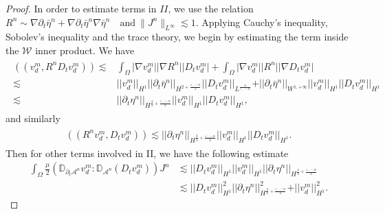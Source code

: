 \documentclass[letterpaper,reqno,10pt,twoside]{amsart}
\theoremstyle{definition}
\theoremstyle{remark}
\def\p{\partial}
\begin{document}
\begin{proof}
		In order to estimate terms in $II$, we use the relation 
		$R^{n}\sim \nabla\p_t\bar{\eta}^{n}+\nabla\p_t\bar{\eta}^{n}\nabla\bar{\eta}^{n}\quad \text{and}\ \|J^{n}\|_{L^\infty}\lesssim 1$.
		Applying Cauchy's inequality, Sobolev's inequality and the trace theory, we begin by estimating the term inside the $\mathcal{W}$ inner product. We have
		\begin{align}
			\begin{aligned}
				((v_{d}^{m},R^{n}D_{t}v_{d}^{m}))\lesssim& \int_{\Omega}\vert \nabla v_{d}^{m}\vert\vert \nabla R^{n}\vert\vert D_{t}v_{d}^{m}\vert+\int_{\Omega}\vert \nabla v_{d}^{m}\vert\vert R^{n}\vert\vert \nabla D_{t}v_{d}^{m}\vert\\
				\lesssim& \vert \vert v_{d}^{m}\vert\vert_{H^{1}}\vert \vert \partial_{t}\bar{\eta}^{n}\vert \vert_{H^{2+\frac{\varepsilon_{-}-\alpha}{2}}}\vert \vert D_{t}v_{d}^{m}\vert \vert_{L^{\frac{4}{\varepsilon_{-}-\alpha}}}+\vert \vert \partial_{t}\bar{\eta}^{n}\vert \vert_{W^{1,+\infty}}\vert \vert v_{d}^{m}\vert \vert_{H^{1}}\vert \vert D_{t}v_{d}^{m}\vert \vert_{H^{1}}\\
				\lesssim& \vert \vert \partial_{t}{\eta}^{n}\vert \vert_{H^{\frac{3}{2}+\frac{\varepsilon_{-}-\alpha}{2}}}\vert \vert v_{d}^{m }\vert \vert_{H^{1}}\vert \vert D_{t}v_{d}^{m}\vert \vert_{H^{1}},
			\end{aligned}
		\end{align}
		and similarly
		\begin{align}
			\begin{aligned}
				((R^{n}v_{d}^{m},D_{t}v_{d}^{m}))\lesssim \vert \vert \partial_{t}{\eta}^{n}\vert \vert_{H^{\frac{3}{2}+\frac{\varepsilon_{-}-\alpha}{2}}}\vert \vert v_{d}^{m }\vert \vert_{H^{1}}\vert \vert D_{t}v_{d}^{m}\vert \vert_{H^{1}}.
			\end{aligned}
		\end{align}
		Then for other terms involved in II, we have the following estimate
		\begin{equation}
			\begin{aligned}
				\int_{\Omega} \frac{\mu}{2}(\mathbb{D}_{\partial_{t}\mathcal{A}^{n}}v_{d}^{m}:\mathbb{D}_{\mathcal{A}^{n}}(D_{t}v_{d}^{m}))J^{n}&\lesssim \vert \vert D_{t}v_{d}^{m}\vert \vert_{H^{1}}\vert\vert v_{d}^{m}\vert \vert_{H^{1}}\vert \vert \partial_{t}\eta^{n}\vert \vert_{H^{\frac{3}{2}+\frac{\varepsilon_{-}-\alpha}{2}}}\\
				&\lesssim \vert \vert D_{t}v_{d}^{m}\vert \vert^{2}_{H^{1}}\vert \vert \partial_{t}\eta^{n}\vert \vert^{2}_{H^{\frac{3}{2}+\frac{\varepsilon_{-}-\alpha}{2}}}+\vert \vert v_{d}^{m}\vert \vert_{H^{1}}^{2}.

\end{aligned}
\end{equation}
\end{proof}
\end{document}

